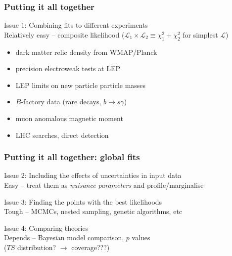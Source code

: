 \documentclass[xcolor=dvipsnames]{beamer}
\begin{document}
\begin{frame}
\frametitle{Putting it all together}  

  \alert{Issue 1:} Combining fits to different experiments\\
  Relatively easy -- composite likelihood ($\mathcal{L}_1\times\mathcal{L}_2 \equiv \chi^2_1 + \chi^2_2$ for simplest $\mathcal{L}$)
  {\footnotesize\begin{itemize}
    \item{dark matter relic density from WMAP/Planck}
    \item{precision electroweak tests at LEP}
    \item{LEP limits on new particle particle masses}
    \item{$B$-factory data (rare decays, $b\rightarrow s\gamma$)}
    \item{muon anomalous magnetic moment}
    \item{LHC searches, direct detection}
  \end{itemize}}
  \vspace{2mm}

\end{frame}

\begin{frame}
\frametitle{Putting it all together: global fits}  

  \alert{Issue 2:} Including the effects of uncertainties in input data\\
  Easy -- treat them as \emph{nuisance parameters} and profile/marginalise\vspace{4mm}

  \alert{Issue 3:} Finding the points with the best likelihoods\\
  Tough -- MCMCs, nested sampling, genetic algorithms, etc\vspace{4mm}

  \alert{Issue 4:} Comparing theories\\
  Depends -- Bayesian model comparison, $p$ values\\
  \hspace{40mm}($TS$ distribution? $\longrightarrow$ coverage???) 

\end{frame}
\end{document}
